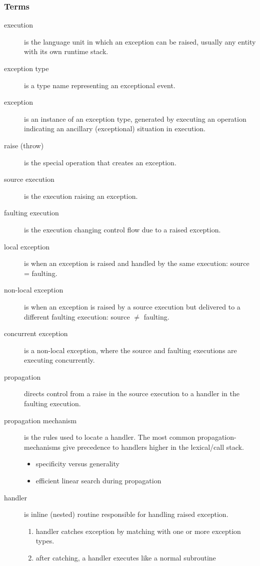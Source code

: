 \documentclass[12pt]{article}
\begin{document}
\subsubsection{Terms}
\begin{description}
\item[execution] is the language unit in which an exception can be raised, usually any entity with its own runtime stack.
\item[exception type] is a type name representing an exceptional event.
\item[exception] is an instance of an exception type, generated by executing an operation indicating an ancillary (exceptional) situation in execution.
\item[raise (throw)] is the special operation that creates an exception.
\item[source execution] is the execution raising an exception.
\item[faulting execution] is the execution changing control flow due to a raised exception.
\item[local exception] is when an exception is raised and handled by the same execution: source = faulting.
\item[non-local exception] is when an exception is raised by a source execution but delivered to a different faulting execution: source $\neq$ faulting.
\item[concurrent exception] is a non-local exception, where the source and faulting executions are executing concurrently.
\item[propagation] directs control from a raise in the source execution to a handler in the faulting execution.
\item[propagation mechanism] is the rules used to locate a handler. The most common propagation-mechanisms give precedence to handlers higher in the lexical/call stack.
\begin{itemize}
\item specificity versus generality
\item efficient linear search during propagation
\end{itemize}
\item[handler] is inline (nested) routine responsible for handling raised exception.
\begin{enumerate}
\item handler catches exception by matching with one or more exception types.
\item after catching, a handler executes like a normal subroutine

\end{enumerate}
\end{description}
\end{document}
